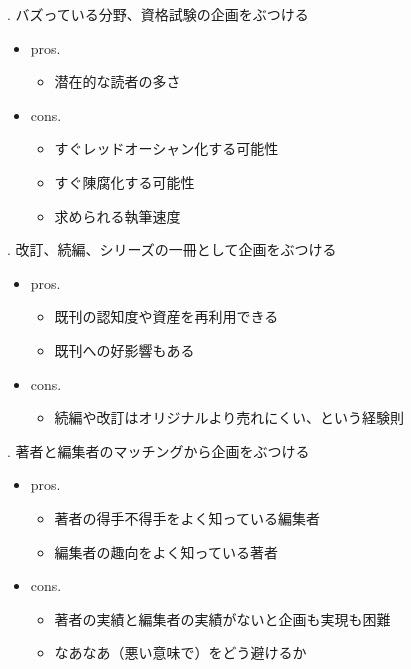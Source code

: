 \documentclass[14pt,dvipdfmx,uplatex]{beamer}
\begin{document}
\begin{frame}[t]{. バズっている分野、資格試験の企画をぶつける}
  \sffamily
  \begin{itemize}
      \item pros.
      \begin{itemize}
        \item 潜在的な読者の多さ
      \end{itemize}
      \item cons.
      \begin{itemize}
        \item すぐレッドオーシャン化する可能性
        \item すぐ陳腐化する可能性
        \item 求められる執筆速度
      \end{itemize}
  \end{itemize}
\end{frame}

\begin{frame}[t]{. 改訂、続編、シリーズの一冊として企画をぶつける}
  \sffamily
  \begin{itemize}
      \item pros.
      \begin{itemize}
        \item 既刊の認知度や資産を再利用できる
        \item 既刊への好影響もある
      \end{itemize}
      \item cons.
      \begin{itemize}
        \item 続編や改訂はオリジナルより売れにくい、という経験則
      \end{itemize}
  \end{itemize}
\end{frame}

\begin{frame}[t]{. 著者と編集者のマッチングから企画をぶつける}
  \sffamily
  \begin{itemize}
      \item pros.
      \begin{itemize}
        \item 著者の得手不得手をよく知っている編集者
        \item 編集者の趣向をよく知っている著者
      \end{itemize}
      \item cons.
      \begin{itemize}
        \item 著者の実績と編集者の実績がないと企画も実現も困難
        \item なあなあ（悪い意味で）をどう避けるか
      \end{itemize}
  \end{itemize}
\end{frame}
\end{document}
